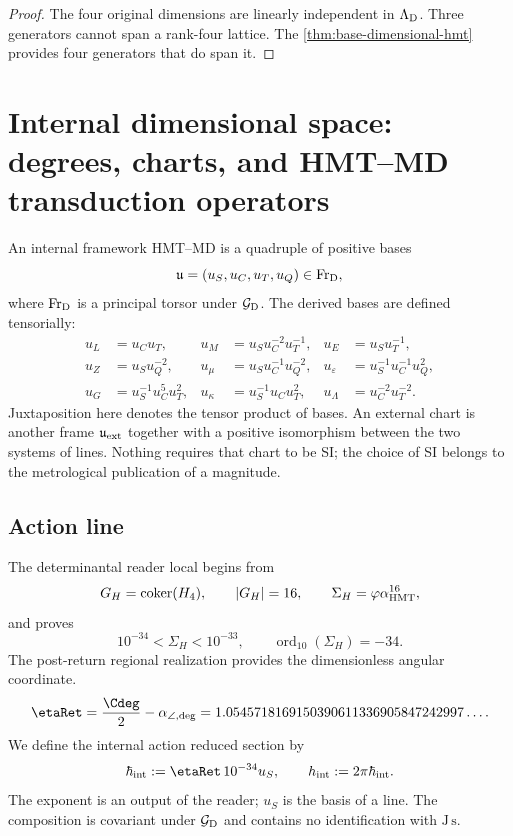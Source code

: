 \begin{proof}
The four original dimensions are linearly independent in
\(\Lambda_{\rm D}\). Three generators cannot span a rank-four
lattice. The \cref{thm:base-dimensional-hmt} provides four generators that
do span it.
\end{proof}

\section{Internal dimensional space: degrees, charts, and HMT–MD transduction operators}

An internal framework HMT--MD is a quadruple of positive bases
\[
 \mathfrak u=(u_S,u_C,u_T,u_Q)
 \in\operatorname{Fr}_{\rm D},
\]
where \(\operatorname{Fr}_{\rm D}\) is a principal torsor under
\(\mathcal G_{\rm D}\). The derived bases are defined tensorially:
\begin{align*}
 u_L&=u_Cu_T,&
 u_M&=u_Su_C^{-2}u_T^{-1},&
 u_E&=u_Su_T^{-1},\\
 u_Z&=u_Su_Q^{-2},&
 u_\mu&=u_Su_C^{-1}u_Q^{-2},&
 u_\varepsilon&=u_S^{-1}u_C^{-1}u_Q^2,\\
 u_G&=u_S^{-1}u_C^5u_T^2,&
 u_\kappa&=u_S^{-1}u_Cu_T^2,&
 u_\Lambda&=u_C^{-2}u_T^{-2}.
\end{align*}
Juxtaposition here denotes the tensor product of bases. An external chart
is another frame \(\mathfrak u_{\rm ext}\) together with a positive isomorphism
between the two systems of lines. Nothing requires that chart to be SI; the
choice of SI belongs to the metrological publication of a magnitude.

\subsection{Action line}

The determinantal reader local begins from
\[
 G_H=\operatorname{coker}(H_4),
 \qquad |G_H|=16,
 \qquad \Sigma_H=\varphi\alpha_{\rm HMT}^{16},
\]
and proves
\[
 10^{-34}<\Sigma_H<10^{-33},
 \qquad \operatorname{ord}_{10}(\Sigma_H)=-34.
\]
The post-return regional realization provides the dimensionless angular coordinate.
\[
 \etaRet
 =\frac{\Cdeg}{2}-\alpha_{\angle,{\rm deg}}
 =1.0545718169150390611336905847242997\ldots.
\]
We define the internal action reduced section by
\begin{equation}
 \hbar_{\rm int}
 :=\etaRet\,10^{-34}u_S,
 \qquad
 h_{\rm int}:=2\pi\hbar_{\rm int}.
 \label{eq:accion-interna}
\end{equation}
The exponent is an output of the reader; \(u_S\) is the basis of a line.
The composition is covariant under \(\mathcal G_{\rm D}\) and contains no
identification with \(\mathrm{J\,s}\).


